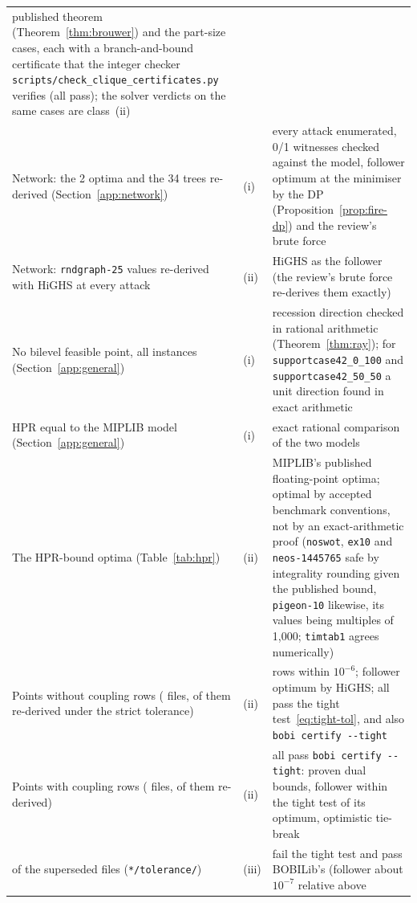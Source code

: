 {\begin{longtable}{@{}>{\raggedright\arraybackslash}p{2.35in}l>{\raggedright\arraybackslash}p{3.0in}@{}}
published theorem (Theorem~\ref{thm:brouwer}) and the \NumCliquePartCases{}
part-size cases, each with a branch-and-bound certificate that the integer checker
\texttt{scripts/check\_clique\_certificates.py} verifies (all pass); the solver
verdicts on the same cases are class~(ii)\\[2pt]
Network: the 2 optima and the 34 trees re-derived (Section~\ref{app:network}) &
(i) & every attack enumerated, 0/1 witnesses checked against the model,
follower optimum at the minimiser by the DP (Proposition~\ref{prop:fire-dp}) and the
review's brute force\\[2pt]
Network: \NetworkRndSmall{} \texttt{rndgraph-25} values re-derived with HiGHS at every attack & (ii) &
HiGHS as the follower (the review's brute force re-derives them exactly)\\[2pt]
No bilevel feasible point, all \NumRayExact{} instances (Section~\ref{app:general}) & (i) &
recession direction checked in rational arithmetic (Theorem~\ref{thm:ray});
for \texttt{supportcase42\_0\_100} and \texttt{supportcase42\_50\_50} a unit
direction found in exact arithmetic\\[2pt]
HPR equal to the MIPLIB model (Section~\ref{app:general}) & (i) &
exact rational comparison of the two models\\[2pt]
The \NumHprOptimal{} HPR-bound optima (Table~\ref{tab:hpr}) & (ii) & MIPLIB's
published floating-point optima; optimal by accepted benchmark conventions,
not by an exact-arithmetic proof (\texttt{noswot}, \texttt{ex10} and
\texttt{neos-1445765} safe by integrality rounding given the published bound,
\texttt{pigeon-10} likewise, its values being multiples of 1,000;
\texttt{timtab1} agrees numerically)\\[2pt]
Points without coupling rows (\NumGeneralFiles{} files, \NumGeneralTightened{} of them
re-derived under the strict tolerance) & (ii) & rows within $10^{-6}$; follower
optimum by HiGHS; all pass the tight test~\eqref{eq:tight-tol}, and
\NumGeneralTightCertified{} also \texttt{bobi certify -{}-tight}\\[2pt]
Points with coupling rows (\NumCoupledFiles{} files,
\NumCoupledTightened{} of them re-derived) & (ii) & all \SuppCoupledExact{} pass
\texttt{bobi certify -{}-tight}: proven dual bounds, follower within the tight test
of its optimum, optimistic tie-break\\[2pt]
\NumTightSupersededBench{} of the \NumTightSuperseded{} superseded files (\texttt{*/tolerance/}) & (iii) &
fail the tight test and pass BOBILib's (follower about $10^{-7}$ relative above

\end{longtable}}
